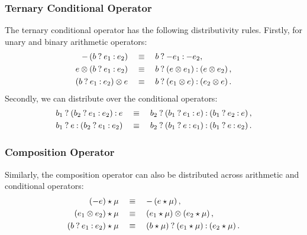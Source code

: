 \subsubsection{Ternary Conditional Operator}

The ternary conditional operator has the following distributivity
rules.  Firstly, for unary and binary arithmetic operators:
\begin{equation}
    \begin{aligned}
        -\left( \select{b}{e_1}{e_2} \right)
        & \quad \eqrel \quad
        \select{b}{-e_1}{-e_2}, \\
        e \opsymbol \left( \select{b}{e_1}{e_2} \right)
        & \quad \eqrel \quad
        \select{b}{%
            \left( e \opsymbol e_1 \right)
        }{%
            \left( e \opsymbol e_2 \right)
        }, \\
        \left( \select{b}{e_1}{e_2} \right) \opsymbol e
        & \quad \eqrel \quad
        \select{b}{%
            \left( e_1 \opsymbol e \right)
        }{%
            \left( e_2 \opsymbol e \right)
        }.
    \end{aligned}
\end{equation}
Secondly, we can distribute over the conditional operators:
\begin{equation}
    \begin{aligned}
        \select{b_1}{\left(\select{b_2}{e_1}{e_2}\right)}{e}
        & \quad \eqrel \quad
        \select{b_2}{%
            \left(\select{b_1}{e_1}{e}\right)}{%
            \left(\select{b_1}{e_2}{e}\right)}, \\
        \select{b_1}{e}{\left(\select{b_2}{e_1}{e_2}\right)}
        & \quad \eqrel \quad
        \select{b_2}{%
            \left(\select{b_1}{e}{e_1}\right)}{%
            \left(\select{b_1}{e}{e_2}\right)}.
    \end{aligned}
\end{equation}

\subsubsection{Composition Operator}

Similarly, the composition operator can also be distributed across arithmetic
and conditional operators:
\begin{equation}
    \begin{aligned}
        \left( -e \right) \expand \mu
        & \quad \eqrel \quad
        -\left( e \expand \mu \right), \\
        \left( e_1 \opsymbol e_2 \right) \expand \mu
        & \quad \eqrel \quad
        \left( e_1 \expand \mu \right) \opsymbol
        \left( e_2 \expand \mu \right), \\
        \left( \select{b}{e_1}{e_2} \right) \expand \mu
        & \quad \eqrel \quad
        \select{%
            \left( b \expand \mu \right)}{%
            \left( e_1 \expand \mu \right)}{%
            \left( e_2 \expand \mu \right)}.
    \end{aligned}
\end{equation}

